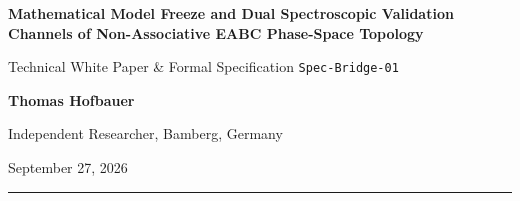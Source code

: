 \documentclass[11pt,a4paper]{article}
\begin{document}
\begin{center}
    {\LARGE\bfseries Mathematical Model Freeze and Dual Spectroscopic Validation Channels of Non-Associative EABC Phase-Space Topology\par}
    \vspace{0.8em}
    {\large Technical White Paper \& Formal Specification \texttt{Spec-Bridge-01}\par}
    \vspace{1.2em}
    {\textbf{Thomas Hofbauer}\par}
    {\small Independent Researcher, Bamberg, Germany\par}
    \vspace{0.6em}
    {\small September 27, 2026\par}
\end{center}

\vspace{0.5em}
\hrule
\vspace{1.0em}
\end{document}
